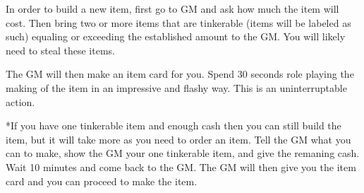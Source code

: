 \documentclass[blue]{LRSguildcamp1}
\begin{document}
\name{\bTest{}}

In order to build a new item, first go to GM and ask how much the item will cost. Then bring two or more items that are tinkerable (items will be labeled as such) equaling or exceeding the established amount to the GM. You will likely need to steal these items.  

The GM will then make an item card for you. Spend 30 seconds role playing the making of the item in an impressive and flashy way. This is an uninterruptable action.

*If you have one tinkerable item and enough cash then you can still build the item, but it will take more as you need to order an item. Tell the GM what you can to make, show the GM your one tinkerable item, and give the remaning cash. Wait 10 minutes and come back to the GM. The GM will then give you the item card and you can proceed to make the item. 

\end{document}
